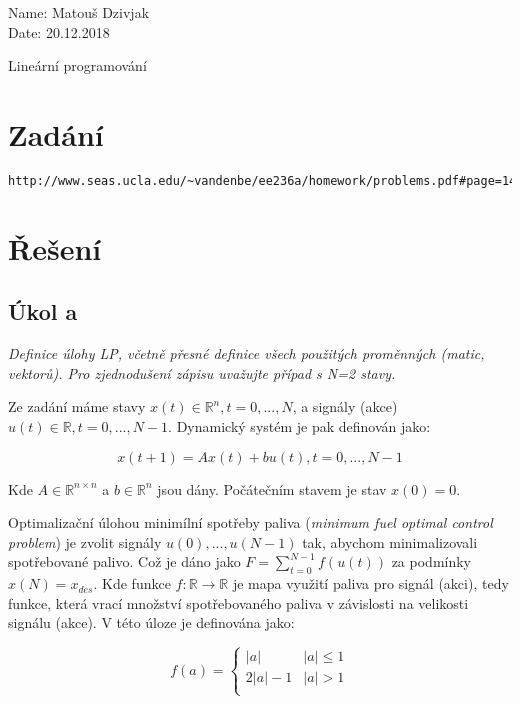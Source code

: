 \documentclass[10pt,a4paper,openright]{article}
\begin{document}
	\begin{flushleft}
		\large Name: Matouš Dzivjak\\
		\large Date: 20.12.2018\\
	\end{flushleft}
\begin{center}
	\huge Lineární programování
\end{center}
\section{Zadání}
\begin{verbatim}
http://www.seas.ucla.edu/~vandenbe/ee236a/homework/problems.pdf#page=14&zoom=auto,-248,211
\end{verbatim}


\section{Řešení}

\subsection{Úkol a}

\textit{Definice úlohy LP, včetně přesné definice všech použitých proměnných (matic, vektorů). 
Pro zjednodušení zápisu uvažujte případ s N=2 stavy.}
\vspace{.4cm}

Ze zadání máme stavy $x(t) \in \mathbb{R}^n, t = 0,...,N$, a signály (akce)
$u(t) \in \mathbb{R}, t = 0,...,N-1$. Dynamický systém je pak definován jako:

\begin{equation}
    x(t+1)=Ax(t) + bu(t), t=0,...,N-1
\end{equation}

Kde $A \in \mathbb{R}^{n \times n}$ a $b \in \mathbb{R}^n$ jsou dány.
Počátečním stavem je stav $x(0) = 0$. 

Optimalizační úlohou minimílní spotřeby paliva (\textit{minimum fuel optimal control problem}) je zvolit 
signály $u(0),...,u(N-1)$ tak, abychom minimalizovali spotřebované palivo.
Což je dáno jako $F=\sum_{t=0}^{N-1}f(u(t))$ za podmínky $x(N)=x_{des}$.
Kde funkce $f: \mathbb{R} \to \mathbb{R}$ je mapa využití paliva pro signál (akci), 
tedy funkce, která vrací množství spotřebovaného paliva v závislosti na velikosti
signálu (akce). V této úloze je definována jako:

\begin{equation}\label{eq:fun}
f(a) = \begin{cases} 
    |a| & |a| \leq 1 \\
    2|a|-1 & |a| > 1 \\
 \end{cases}
\end{equation}
\end{document}

